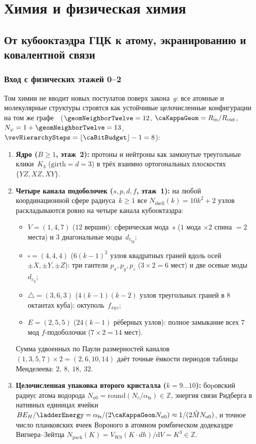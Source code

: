\part{Химия и физическая химия}

\chapter{От кубооктаэдра ГЦК к атому, экранированию и ковалентной связи}
\label{ch:chem-foundations}

\section{Вход с физических этажей 0--2}

Том химии не вводит новых постулатов поверх закона~$g$: все атомные и молекулярные структуры
строятся как устойчивые целочисленные конфигурации на том же графе~\latGCKshort\ ($\geomNeighborTwelve=12$,
$\caKappaGeom=R_{\mathrm{in}}/R_{\mathrm{out}}$, $N_\varphi=1+\geomNeighborTwelve=13$, $\vevHierarchySteps=\lfloor\caBitBudget\rfloor-1=8$):
\begin{enumerate}[noitemsep]
\item \textbf{Ядро ($B\ge 1$, этаж~2):} протоны и нейтроны как замкнутые треугольные клики~$K_3$ ($\mathrm{girth}=d=3$)
  в трёх взаимно ортогональных плоскостях $\{YZ,XZ,XY\}$.
\item \textbf{Четыре канала подоболочек ($s,p,d,f$, этаж~1):} на любой координационной сфере радиуса~$k\ge 1$
  все $N_{\mathrm{shell}}(k)=10k^2+2$ узлов раскладываются ровно на четыре канала кубооктаэдра:
  \begin{itemize}[noitemsep]
  \item $V=(1,4,7)$ ($12$ вершин): сферическая мода~$s$ ($1$ мода $\times 2$ спина $=2$ места) и $3$ диагональные моды~$d_{t_{2g}}$;
  \item $\square=(4,4,4)$ ($6(k-1)^2$ узлов квадратных граней вдоль осей $\pm X,\pm Y,\pm Z$):
    три гантели $p_x,p_y,p_z$ ($3\times 2=6$ мест) и две осевые моды~$d_{e_g}$;
  \item $\triangle=(3,6,3)$ ($4(k-1)(k-2)$ узлов треугольных граней в $8$ октантах куба): октуполь~$f_{xyz}$;
  \item $E=(2,5,5)$ ($24(k-1)$ рёберных узлов): полное замыкание всех $7$ мод $f$-подоболочки ($7\times 2=14$ мест).
  \end{itemize}
  Сумма удвоенных по Паули размерностей каналов $(1,3,5,7)\times 2=(2,6,10,14)$ даёт точные ёмкости периодов
  таблицы Менделеева: $2,\ 8,\ 18,\ 32$.
\item \textbf{Целочисленная упаковка второго кристалла ($k=9\ldots 10$):}
  боpовский радиус атома водорода $N_{a0}=\mathrm{round}(N_c/\alpha_{\mathrm{fs}})\in\mathbb{Z}$,
  энергия связи Ридберга в нативных единицах ячейки $BE_H/\ladderEnergy = \alpha_{\mathrm{fs}}/(2\caKappaGeom N_{a0}) \approx 1/(2\hat M N_{a0})$,
  и точное число планковских ячеек Вороного в атомном ромбическом додекаэдре Вигнера--Зейтца
  $N_{\mathrm{pack}}(K)=V_{\mathrm{WS}}(K\cdot dh)/\mathrm{d}V = K^3\in\mathbb{Z}$.
\end{enumerate}

